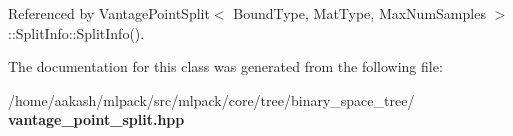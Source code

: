 Referenced by Vantage\+Point\+Split$<$ Bound\+Type, Mat\+Type, Max\+Num\+Samples $>$\+::\+Split\+Info\+::\+Split\+Info().



The documentation for this class was generated from the following file\+:\begin{DoxyCompactItemize}
\item 
/home/aakash/mlpack/src/mlpack/core/tree/binary\+\_\+space\+\_\+tree/\textbf{ vantage\+\_\+point\+\_\+split.\+hpp}\end{DoxyCompactItemize}
